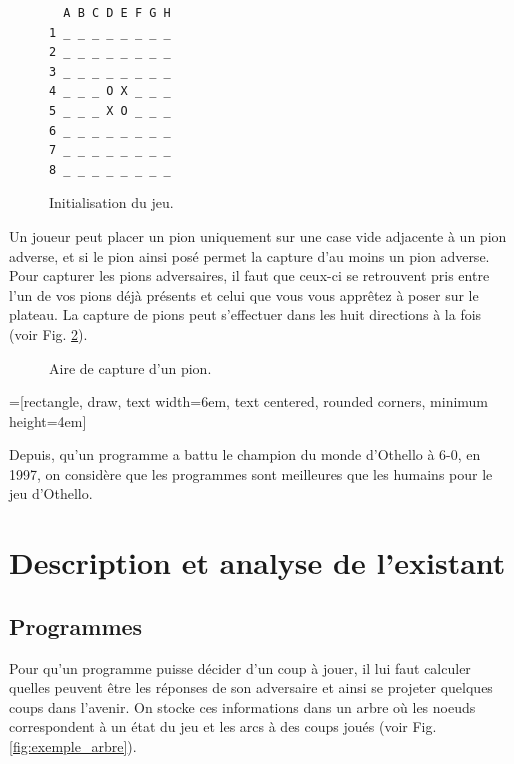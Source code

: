 \documentclass[10pt,a4paper]{article}
\begin{document}
\begin{figure}[H]    
\centering
\begin{BVerbatim}
  A B C D E F G H
1 _ _ _ _ _ _ _ _
2 _ _ _ _ _ _ _ _
3 _ _ _ _ _ _ _ _
4 _ _ _ O X _ _ _
5 _ _ _ X O _ _ _
6 _ _ _ _ _ _ _ _
7 _ _ _ _ _ _ _ _
8 _ _ _ _ _ _ _ _
\end{BVerbatim}
\caption {Initialisation du jeu. \label{fig:début_du_jeu}}
\end{figure}

Un joueur peut placer un pion uniquement sur une case vide adjacente à un pion adverse, et si le pion ainsi posé permet la capture d'au moins un pion adverse. Pour capturer les pions adversaires, il faut que ceux-ci se retrouvent pris entre l'un de vos pions déjà présents et celui que vous vous apprêtez à poser sur le plateau. La capture de pions peut s'effectuer dans les huit directions à la fois (voir Fig. \ref{fig:aire_de_capture}).

\begin{figure}[H]    
\centering
{}
\caption {Aire de capture d'un pion.\label{fig:aire_de_capture}}
\end{figure}
=[rectangle, draw, text width=6em, text centered, rounded corners, minimum height=4em]

Depuis, qu'un programme a battu le champion du monde d'Othello à 6-0, en 1997\cite{CK06}, on considère que les programmes sont meilleures que les humains pour le jeu d'Othello.

\section{Description et analyse de l'existant}

\subsection{Programmes}

Pour qu'un programme puisse décider d'un coup à jouer, il lui faut calculer quelles peuvent être les réponses de son adversaire et ainsi se projeter quelques coups dans l'avenir. On stocke ces informations dans un arbre où les noeuds correspondent à un état du jeu et les arcs à des coups joués (voir Fig. \ref{fig:exemple_arbre}).
\end{document}
